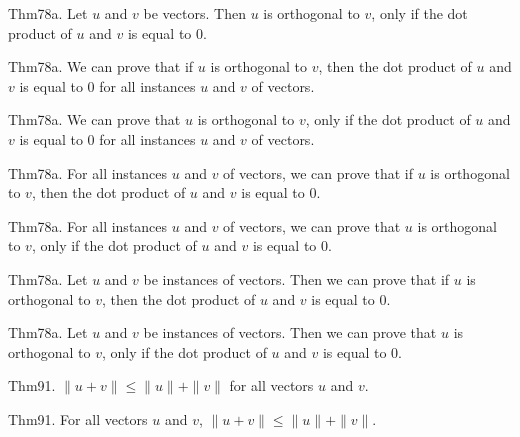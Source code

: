 \documentclass{article}
\begin{document}
Thm78a. Let $u$ and $v$ be vectors. Then $u$ is orthogonal to $v$, only if the dot product of $u$ and $v$ is equal to $0$.

Thm78a. We can prove that if $u$ is orthogonal to $v$, then the dot product of $u$ and $v$ is equal to $0$ for all instances $u$ and $v$ of vectors.

Thm78a. We can prove that $u$ is orthogonal to $v$, only if the dot product of $u$ and $v$ is equal to $0$ for all instances $u$ and $v$ of vectors.

Thm78a. For all instances $u$ and $v$ of vectors, we can prove that if $u$ is orthogonal to $v$, then the dot product of $u$ and $v$ is equal to $0$.

Thm78a. For all instances $u$ and $v$ of vectors, we can prove that $u$ is orthogonal to $v$, only if the dot product of $u$ and $v$ is equal to $0$.

Thm78a. Let $u$ and $v$ be instances of vectors. Then we can prove that if $u$ is orthogonal to $v$, then the dot product of $u$ and $v$ is equal to $0$.

Thm78a. Let $u$ and $v$ be instances of vectors. Then we can prove that $u$ is orthogonal to $v$, only if the dot product of $u$ and $v$ is equal to $0$.

Thm91. $\| u + v \| \leq \| u \| + \| v \|$ for all vectors $u$ and $v$.

Thm91. For all vectors $u$ and $v$, $\| u + v \| \leq \| u \| + \| v \|$.
\end{document}
